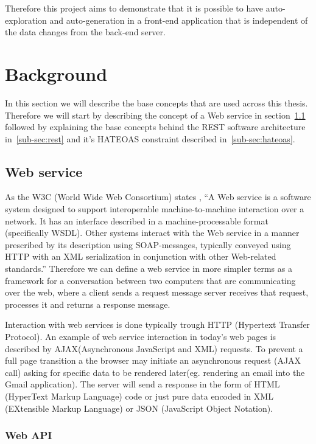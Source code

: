 Therefore this project aims to demonstrate that it is possible to have auto-exploration and auto-generation in a front-end application that is independent of the data changes from the back-end server.


\section{Background}
\label{sec:background}

In this section we will describe the base concepts that are used across this thesis. Therefore we will start by describing the concept of a Web service in section~\ref{sub-sec:web-service} followed by explaining the base concepts behind the REST software architecture in~\ref{sub-sec:rest} and it's HATEOAS constraint described in~\ref{sub-sec:hateoas}.

\subsection{Web service}
\label{sub-sec:web-service}

As the W3C (World Wide Web Consortium) states \cite{W3C}, ``A Web service is a software system designed to support interoperable machine-to-machine interaction over a network. It has an interface described in a machine-processable format (specifically WSDL). Other systems interact with the Web service in a manner prescribed by its description using SOAP-messages, typically conveyed using HTTP with an XML serialization in conjunction with other Web-related standards.'' Therefore we can define a web service in more simpler terms as a framework for a conversation between two computers that are communicating over the web, where a client sends a request message server receives that request, processes it and returns a response message.

Interaction with web services is done typically trough HTTP (Hypertext Transfer Protocol). An example of web service interaction in today's web pages is described by AJAX(Asynchronous JavaScript and XML) requests.   To prevent a full page transition a the browser may initiate an asynchronous request (AJAX call) asking for specific data to be rendered later(eg. rendering an email into the Gmail application). The server will send a response in the form of HTML (HyperText Markup Language) code or just pure data encoded in XML (EXtensible Markup Language) or JSON (JavaScript Object Notation).

\subsubsection{Web API}
\label{sub-sub-sec:web-api}

